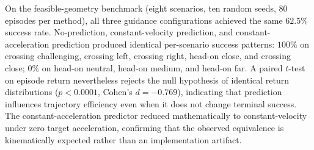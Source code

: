 
On the feasible-geometry benchmark (eight scenarios, ten random seeds, $80$ episodes per method), all three guidance configurations achieved the same $62.5\%$ success rate. No-prediction, constant-velocity prediction, and constant-acceleration prediction produced identical per-scenario success patterns: $100\%$ on crossing challenging, crossing left, crossing right, head-on close, and crossing close; $0\%$ on head-on neutral, head-on medium, and head-on far. A paired $t$-test on episode return nevertheless rejects the null hypothesis of identical return distributions ($p < 0.0001$, Cohen's $d = -0.769$), indicating that prediction influences trajectory efficiency even when it does not change terminal success. The constant-acceleration predictor reduced mathematically to constant-velocity under zero target acceleration, confirming that the observed equivalence is kinematically expected rather than an implementation artifact.
